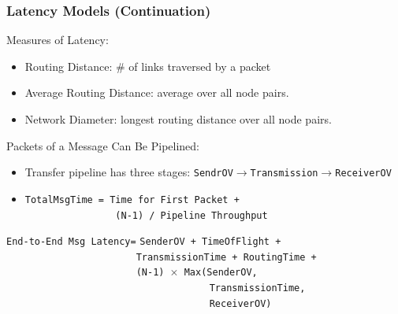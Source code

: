 \documentclass{beamer}
\renewcommand{\emph}[1]{\textcolor{structure}{#1}}
\newcommand{\emp}[1]{\textcolor{DikuRed}{ #1}}
\begin{document}
\begin{frame}[fragile,t]
\frametitle{Latency Models (Continuation)}

\emph{Measures of Latency:}
\begin{itemize}
    \item \emp{Routing Distance}: \# of links traversed by a packet
    \item \emp{Average Routing Distance}: average over all node pairs.
    \item \emp{Network Diameter}: longest routing distance over all node pairs.
\end  {itemize}\medskip

\emph{Packets of a Message Can Be Pipelined:}
\begin{itemize}
    \item Transfer pipeline has three stages: {\tt SendrOV$\rightarrow$Transmission$\rightarrow$ReceiverOV}
    \item {\tt TotalMsgTime = Time for First Packet +}\\ 
          {\tt~~~~~~~~~~~~~~~~(N-1) / Pipeline Throughput} 
\end  {itemize}\medskip

\alert{\tt End-to-End Msg Latency=}\emp{\tt SenderOV + TimeOfFlight + }\\
\emp{\tt~~~~~~~~~~~~~~~~~~~~~~~TransmissionTime + RoutingTime +}\\
\emp{\tt~~~~~~~~~~~~~~~~~~~~~~~(N-1) $\times$ Max(SenderOV,}\\
\emp{\tt~~~~~~~~~~~~~~~~~~~~~~~~~~~~~~~~~~~~TransmissionTime,}\\
\emp{\tt~~~~~~~~~~~~~~~~~~~~~~~~~~~~~~~~~~~~ReceiverOV)}

\end{frame}
\end{document}
